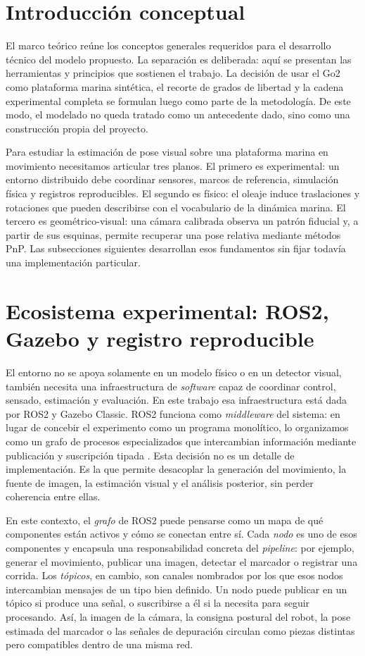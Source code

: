\documentclass[12pt,a4paper]{report}
\begin{document}
\section{Introducción conceptual}

El marco teórico reúne los conceptos generales requeridos para el desarrollo
técnico del modelo propuesto. La separación es deliberada: aquí se
presentan las herramientas y principios que sostienen el trabajo. La decisión
de usar el Go2 como plataforma marina sintética, el recorte de grados de
libertad y la cadena experimental completa se formulan luego como parte de la
metodología. De este modo, el modelado no queda tratado como un antecedente
dado, sino como una construcción propia del proyecto.

Para estudiar la estimación de pose visual sobre una plataforma marina en
movimiento necesitamos articular tres planos. El primero es experimental: un
entorno distribuido debe coordinar sensores, marcos de referencia, simulación
física y registros reproducibles. El segundo es físico: el oleaje induce
traslaciones y rotaciones que pueden describirse con el vocabulario de la
dinámica marina. El tercero es geométrico-visual: una cámara calibrada observa
un patrón fiducial y, a partir de sus esquinas, permite recuperar una pose
relativa mediante métodos PnP. Las subsecciones siguientes desarrollan esos
fundamentos sin fijar todavía una implementación particular.

\section{Ecosistema experimental: ROS2, Gazebo y registro reproducible}

El entorno no se apoya solamente en un modelo físico o en un detector visual,
también necesita una infraestructura de \textit{software} capaz de coordinar control,
sensado, estimación y evaluación. En este trabajo esa infraestructura está dada
por ROS2 y Gazebo Classic. ROS2 funciona como \emph{middleware} del sistema: en
lugar de concebir el experimento como un programa monolítico, lo organizamos
como un grafo de procesos especializados que intercambian información mediante
publicación y suscripción tipada \citep{ros2_basic_concepts}. Esta decisión no
es un detalle de implementación. Es la que permite desacoplar la generación del
movimiento, la fuente de imagen, la estimación visual y el análisis posterior,
sin perder coherencia entre ellas.

En este contexto, el \emph{grafo} de ROS2 puede pensarse como un mapa de qué
componentes están activos y cómo se conectan entre sí. Cada \emph{nodo} es uno
de esos componentes y encapsula una responsabilidad concreta del \textit{pipeline}: por
ejemplo, generar el movimiento, publicar una imagen, detectar el marcador o
registrar una corrida. Los \emph{tópicos}, en cambio, son canales nombrados por
los que esos nodos intercambian mensajes de un tipo bien definido. Un nodo
puede publicar en un tópico si produce una señal, o suscribirse a él si la
necesita para seguir procesando. Así, la imagen de la cámara, la consigna
postural del robot, la pose estimada del marcador o las señales de depuración
circulan como piezas distintas pero compatibles dentro de una misma red.
\end{document}
